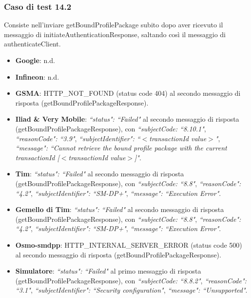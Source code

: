 \documentclass[10pt, oneside]{book}
\begin{document}
\subsubsection{Caso di test 14.2}
Consiste nell'inviare getBoundProfilePackage subito dopo aver ricevuto il messaggio di initiateAuthenticationResponse, saltando così il messaggio di authenticateClient.
\begin{itemize}
\item \textbf{Google}: n.d.
\item \textbf{Infineon}: n.d.
\item \textbf{GSMA}: HTTP\_NOT\_FOUND (status code 404) al secondo messaggio di risposta (getBoundProfilePackageResponse).
\item \textbf{Iliad \& Very Mobile}: \textit{``status": ``Failed"} al secondo messaggio di risposta (getBoundProfilePackageResponse), con \textit{``subjectCode: ``8.10.1"}, \textit{``reasonCode": ``3.9"}, \textit{``subjectIdentifier": ``$<$transactionId value$>$"}, \textit{``message": ``Cannot retrieve the bound profile package with the current transactionId [$<$transactionId value$>$]"}.
\item \textbf{Tim}: \textit{``status": ``Failed"} al secondo messaggio di risposta (getBoundProfilePackageResponse), con \textit{``subjectCode: ``8.8"}, \textit{``reasonCode": ``4.2"}, \textit{``subjectIdentifier": ``SM-DP+"}, \textit{``message": ``Execution Error"}.
\item \textbf{Gemello di Tim}: \textit{``status": ``Failed"} al secondo messaggio di risposta (getBoundProfilePackageResponse), con \textit{``subjectCode: ``8.8"}, \textit{``reasonCode": ``4.2"}, \textit{``subjectIdentifier": ``SM-DP+"}, \textit{``message": ``Execution Error"}.
\item \textbf{Osmo-smdpp}: HTTP\_INTERNAL\_SERVER\_ERROR (status code 500) al secondo messaggio di risposta (getBoundProfilePackageResponse).
\item \textbf{Simulatore}: \textit{``status": ``Failed"} al primo messaggio di risposta (getBoundProfilePackageResponse), con \textit{``subjectCode: ``8.8.2"}, \textit{``reasonCode": ``3.1"}, \textit{``subjectIdentifier": ``Security configuration"}, \textit{``message": ``Unsupported"}.
\end{itemize}
\end{document}
